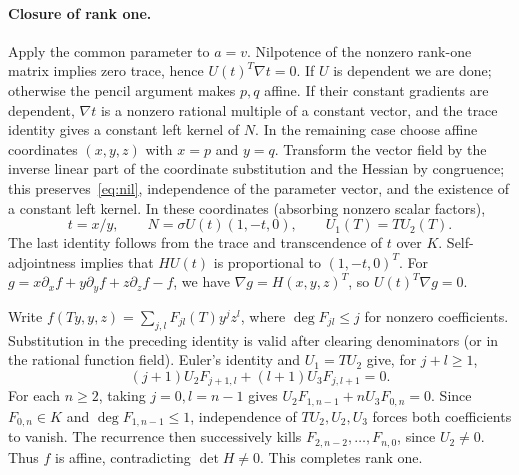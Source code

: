 \documentclass[11pt,a4paper]{article}
\begin{document}
\paragraph{Closure of rank one.} Apply the common parameter to $a=v$. Nilpotence of the nonzero rank-one matrix implies zero trace, hence $U(t)^T\nabla t=0$. If $U$ is dependent we are done; otherwise the pencil argument makes $p,q$ affine. If their constant gradients are dependent, $\nabla t$ is a nonzero rational multiple of a constant vector, and the trace identity gives a constant left kernel of $N$. In the remaining case choose affine coordinates $(x,y,z)$ with $x=p$ and $y=q$. Transform the vector field by the inverse linear part of the coordinate substitution and the Hessian by congruence; this preserves~\eqref{eq:nil}, independence of the parameter vector, and the existence of a constant left kernel. In these coordinates (absorbing nonzero scalar factors),
\[
 t=x/y,\qquad N=\sigma U(t)(1,-t,0),\qquad U_1(T)=T U_2(T).
\]
The last identity follows from the trace and transcendence of $t$ over $K$. Self-adjointness implies that $HU(t)$ is proportional to $(1,-t,0)^T$. For $g=x\partial_x f+y\partial_y f+z\partial_z f-f$, we have $\nabla g=H(x,y,z)^T$, so $U(t)^T\nabla g=0$.

Write $f(Ty,y,z)=\sum_{j,l}F_{jl}(T)y^jz^l$, where $\deg F_{jl}\le j$ for nonzero coefficients. Substitution in the preceding identity is valid after clearing denominators (or in the rational function field). Euler's identity and $U_1=TU_2$ give, for $j+l\ge1$,
\[
 (j+1)U_2 F_{j+1,l}+(l+1)U_3 F_{j,l+1}=0.
\]
For each $n\ge2$, taking $j=0,l=n-1$ gives $U_2 F_{1,n-1}+nU_3 F_{0,n}=0$. Since $F_{0,n}\in K$ and $\deg F_{1,n-1}\le1$, independence of $TU_2,U_2,U_3$ forces both coefficients to vanish. The recurrence then successively kills $F_{2,n-2},\ldots,F_{n,0}$, since $U_2\ne0$. Thus $f$ is affine, contradicting $\det H\ne0$. This completes rank one.
\end{document}
